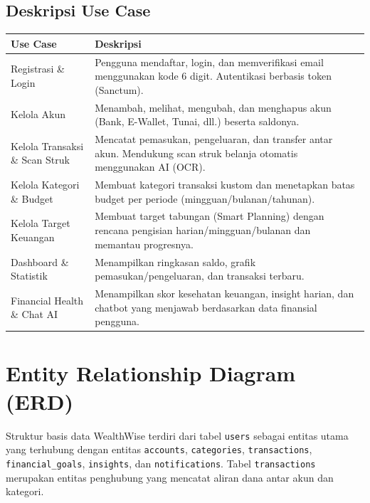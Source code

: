\documentclass[11pt]{article}
\begin{document}
\subsection{Deskripsi Use Case}
\begin{table}[h]
\centering
\begin{tabular}{@{}p{4.5cm}p{9cm}@{}}
\toprule
\textbf{Use Case} & \textbf{Deskripsi} \\
\midrule
Registrasi \& Login & Pengguna mendaftar, login, dan memverifikasi email menggunakan kode 6 digit. Autentikasi berbasis token (Sanctum). \\
Kelola Akun & Menambah, melihat, mengubah, dan menghapus akun (Bank, E-Wallet, Tunai, dll.) beserta saldonya. \\
Kelola Transaksi \& Scan Struk & Mencatat pemasukan, pengeluaran, dan transfer antar akun. Mendukung scan struk belanja otomatis menggunakan AI (OCR). \\
Kelola Kategori \& Budget & Membuat kategori transaksi kustom dan menetapkan batas budget per periode (mingguan/bulanan/tahunan). \\
Kelola Target Keuangan & Membuat target tabungan (Smart Planning) dengan rencana pengisian harian/mingguan/bulanan dan memantau progresnya. \\
Dashboard \& Statistik & Menampilkan ringkasan saldo, grafik pemasukan/pengeluaran, dan transaksi terbaru. \\
Financial Health \& Chat AI & Menampilkan skor kesehatan keuangan, insight harian, dan chatbot yang menjawab berdasarkan data finansial pengguna. \\
\bottomrule
\end{tabular}
\end{table}

\newpage
\section{Entity Relationship Diagram (ERD)}

Struktur basis data WealthWise terdiri dari tabel \texttt{users} sebagai entitas utama yang terhubung dengan entitas \texttt{accounts}, \texttt{categories}, \texttt{transactions}, \texttt{financial\_goals}, \texttt{insights}, dan \texttt{notifications}. Tabel \texttt{transactions} merupakan entitas penghubung yang mencatat aliran dana antar akun dan kategori.
\end{document}
